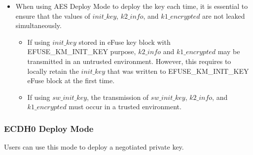 \documentclass[main\_\_EN.tex]{subfiles}
\begin{document}
\begin{itemize}
\begin{itemize}
    \end{itemize}
    \item When using AES Deploy Mode to deploy the key each time, it is essential to ensure that the values of \begin{math}init\_key\end{math}, \begin{math}k2\_info\end{math}, and \begin{math}k1\_encrypted\end{math} are not leaked simultaneously.
    \begin{itemize}
        \item If using \begin{math}init\_key\end{math} stored in eFuse key block with EFUSE\_KM\_INIT\_KEY purpose, \begin{math}k2\_info\end{math} and \begin{math}k1\_encrypted\end{math} may be transmitted in an untrusted environment. However, this requires to locally retain the \begin{math}init\_key\end{math} that was written to EFUSE\_KM\_INIT\_KEY eFuse block at the first time.
        \item If using \begin{math}sw\_init\_key\end{math}, the transmission of \begin{math}sw\_init\_key\end{math}, \begin{math}k2\_info\end{math}, and \begin{math}k1\_encrypted\end{math} must occur in a trusted environment.
    \end{itemize}
\end{itemize}


\subsubsection{ECDH0 Deploy Mode}

Users can use this mode to deploy a negotiated private key.
\end{document}
